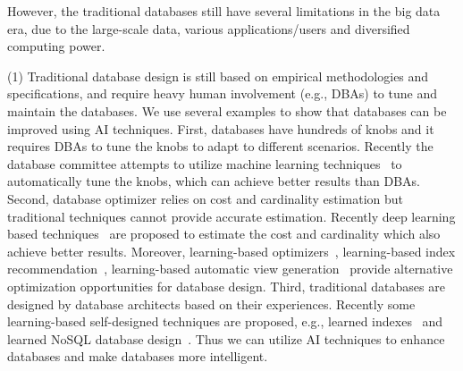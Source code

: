 
However, the traditional databases still have several limitations in the big data era, due to the large-scale data, various applications/users and diversified computing power.

(1) Traditional database design is still based on empirical methodologies and specifications, and require heavy human involvement (e.g., DBAs) to tune and maintain the databases. We use several examples to show that databases can be improved using AI techniques. First, databases have hundreds of knobs and it requires DBAs to tune the knobs to adapt to different scenarios. Recently the database committee attempts to utilize machine learning techniques~\cite{DBLP:conf/sigmod/AkenPGZ17, DBLP:conf/vldb/qtune19,  DBLP:conf/sigmod/cdbtune19} to automatically tune the knobs, which can achieve better results than DBAs. Second, database optimizer relies on cost and cardinality estimation but traditional techniques cannot provide accurate estimation. Recently deep learning based techniques~\cite{DBLP:conf/cidr/KipfKRLBK19, DBLP:conf/sigmod/OrtizBGK18} are proposed to estimate the cost and cardinality which also achieve better results. Moreover, learning-based optimizers~\cite{DBLP:journals/corr/abs-1808-03196, DBLP:conf/sigmod/MarcusP18}, learning-based  index recommendation~\cite{DBLP:conf/hais/PedrozoNR18}, learning-based automatic view generation~\cite{DBLP:journals/corr/abs-1903-01363} provide alternative optimization opportunities for database design. Third, traditional databases are designed by database  architects based on their experiences. Recently some learning-based self-designed techniques are proposed, e.g., learned indexes~\cite{DBLP:conf/sigmod/KraskaBCDP18} and learned NoSQL database design~\cite{DBLP:conf/cidr/IdreosDQAHRLJGL19}. Thus we can utilize AI techniques to enhance databases and make databases more intelligent.      


